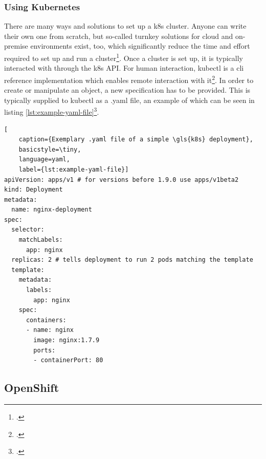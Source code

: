 
\subsubsection{Using Kubernetes}
There are many ways and solutions to set up a \gls{k8s} cluster. Anyone can write their own one from scratch, but so-called turnkey solutions for cloud and on-premise environments exist, too, which significantly reduce the time and effort required to set up and run a cluster\footcite[][, sections 'Turnkey Cloud Solutions' and 'On-Premises turnkey cloud solutions']{turnkey}.
Once a cluster is set up, it is typically interacted with through the \gls{k8s} API. For human interaction, kubectl is a \gls{cli} reference implementation which enables remote interaction with it\footcite[][, section 'The Kubernetes API']{k8sApi}.
In order to create or manipulate an object, a new specification has to be provided. This is typically supplied to kubectl as a .yaml file, an example of which can be seen in listing \ref{lst:example-yaml-file}\footcite[][, section 'Describing a Kubernetes Object']{k8sObjects}.

\begin{lstlisting}[
	caption={Exemplary .yaml file of a simple \gls{k8s} deployment},
	basicstyle=\tiny,
	language=yaml,
	label={lst:example-yaml-file}]
apiVersion: apps/v1 # for versions before 1.9.0 use apps/v1beta2
kind: Deployment
metadata:
  name: nginx-deployment
spec:
  selector:
    matchLabels:
      app: nginx
  replicas: 2 # tells deployment to run 2 pods matching the template
  template:
    metadata:
      labels:
        app: nginx
    spec:
      containers:
      - name: nginx
        image: nginx:1.7.9
        ports:
        - containerPort: 80
\end{lstlisting}


\subsection{OpenShift} \label{openshiftExplanation}

